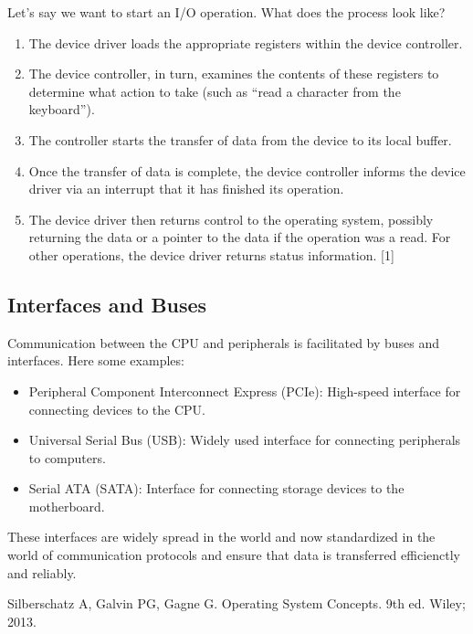 \documentclass[a4paper]{article}
\begin{document}
\noindent
Let's say we want to start an I/O operation. What does the process look like?

\begin{enumerate}
    \item The device driver loads the appropriate registers
    within the device controller.
    \item The device controller, in turn, examines the
    contents of these registers to determine what action to take (such as “read
    a character from the keyboard”).
    \item The controller starts the transfer of data from
    the device to its local buffer. 
    \item Once the transfer of data is complete, the device
    controller informs the device driver via an interrupt that it has finished its
    operation. 
    \item The device driver then returns control to the operating system,
    possibly returning the data or a pointer to the data if the operation was a read.
    For other operations, the device driver returns status information. [1]
\end{enumerate}

\subsection{Interfaces and Buses}

Communication between the CPU and peripherals is facilitated by buses and interfaces. Here some examples:

\begin{itemize}
    \item Peripheral Component Interconnect Express (PCIe): High-speed interface for connecting devices to the CPU.
    \item Universal Serial Bus (USB): Widely used interface for connecting peripherals to computers.
    \item Serial ATA (SATA): Interface for connecting storage devices to the motherboard.
\end{itemize}
These interfaces are widely spread in the world and now standardized in the world of communication protocols and ensure that data is transferred efficienctly and reliably.



\begin{thebibliography}{9}
    Silberschatz A, Galvin PG, Gagne G. Operating System Concepts. 9th ed. Wiley; 2013.
\end{thebibliography}
\end{document}
